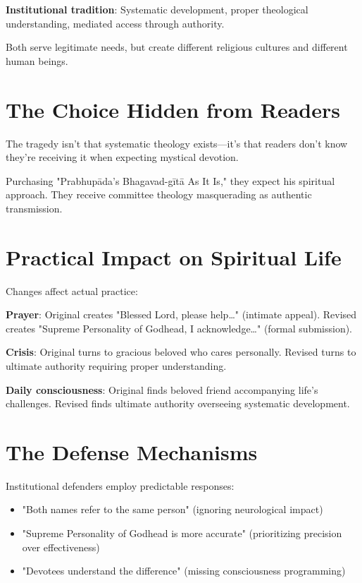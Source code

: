 \documentclass[11pt,twoside]{book}
\begin{document}
\textbf{\textbf{Institutional tradition}}: Systematic development, proper theological understanding, mediated access through authority.

Both serve legitimate needs, but create different religious cultures and different human beings.
\section*{The Choice Hidden from Readers}
\label{sec:org8548838}

The tragedy isn't that systematic theology exists—it's that readers don't know they're receiving it when expecting mystical devotion.

Purchasing "Prabhupāda's Bhagavad-gītā As It Is," they expect his spiritual approach. They receive committee theology masquerading as authentic transmission.
\section*{Practical Impact on Spiritual Life}
\label{sec:orgf9fd99f}

Changes affect actual practice:

\textbf{\textbf{Prayer}}: Original creates "Blessed Lord, please help\ldots{}" (intimate appeal). Revised creates "Supreme Personality of Godhead, I acknowledge\ldots{}" (formal submission).

\textbf{\textbf{Crisis}}: Original turns to gracious beloved who cares personally. Revised turns to ultimate authority requiring proper understanding.

\textbf{\textbf{Daily consciousness}}: Original finds beloved friend accompanying life's challenges. Revised finds ultimate authority overseeing systematic development.
\section*{The Defense Mechanisms}
\label{sec:orge0a0f94}

Institutional defenders employ predictable responses:

\begin{itemize}
\item "Both names refer to the same person" (ignoring neurological impact)
\item "Supreme Personality of Godhead is more accurate" (prioritizing precision over effectiveness)
\item "Devotees understand the difference" (missing consciousness programming)
\end{itemize}
\end{document}
